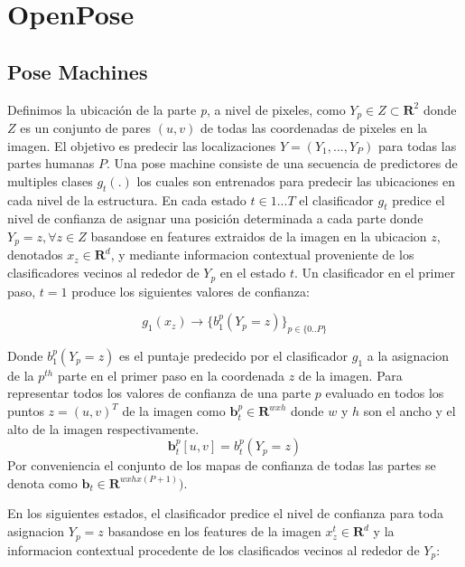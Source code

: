 \documentclass[runningheads]{llncs}
\begin{document}
\section{OpenPose}

\subsection{Pose Machines}

Definimos la ubicación de la parte \textit{p}, a nivel de pixeles, como $Y_{\textit{p}} \in Z \subset \mathbf{R}^{2}$ donde $Z$ es un conjunto de pares $(u,v)$ de todas las coordenadas de pixeles en la imagen. El objetivo es predecir las localizaciones $ Y = (Y_{1},..., Y_{\textit{P}}) $ para todas las partes humanas $P$. Una pose machine consiste de una secuencia de predictores de multiples clases $g_{t}(.)$ los cuales son entrenados para predecir las ubicaciones en cada nivel de la estructura. En cada estado $t \in {1...T}$ el clasificador $g_{t}$ predice el nivel de confianza de asignar una posición determinada a cada parte  donde $Y_{\textit{p}} = z, \forall z \in Z$ basandose en features extraidos de la imagen en la ubicacion $z$, denotados $ x_{z} \in \mathbf{R}^{d}$, y mediante informacion contextual proveniente de los clasificadores vecinos al rededor de $Y_{\textit{p}}$ en el estado $t$.
Un clasificador en el primer paso, $t= 1$ produce los siguientes valores de confianza:

\begin{equation}
g_{1}(x_{z}) \rightarrow \{ b_{1}^p(Y_{p} = z) \}_{p \in \{0..P\}}
\end{equation}

Donde $ b_{1}^p(Y_{p} = z)$ es el puntaje predecido por el clasificador $g_1$ a la asignacion de la $p^{th}$ parte en el primer paso en la coordenada $z$ de la imagen. Para representar todos los valores de confianza de una parte $p$ evaluado en todos los puntos $z=(u,v)^T$ de la imagen como $\textbf{b}_t^p \in \mathbf{R}^{wxh}$ donde $w$ y $h$ son el ancho y el alto de la imagen respectivamente.
\begin{equation}
\textbf{b}_t^p[u,v]= b_t^p(Y_p = z)
\end{equation}
Por conveniencia el conjunto de los mapas de confianza de todas las partes se denota como $\textbf{b}_t \in \mathbf{R}^{wxhx(P+1)})$.

En los siguientes estados, el clasificador predice el nivel de confianza para toda asignacion $Y_p = z$ basandose en los features de la imagen $x_z^t \in \mathbf{R}^d$ y la informacion contextual procedente de los clasificados vecinos al rededor de $Y_p$:
\end{document}
